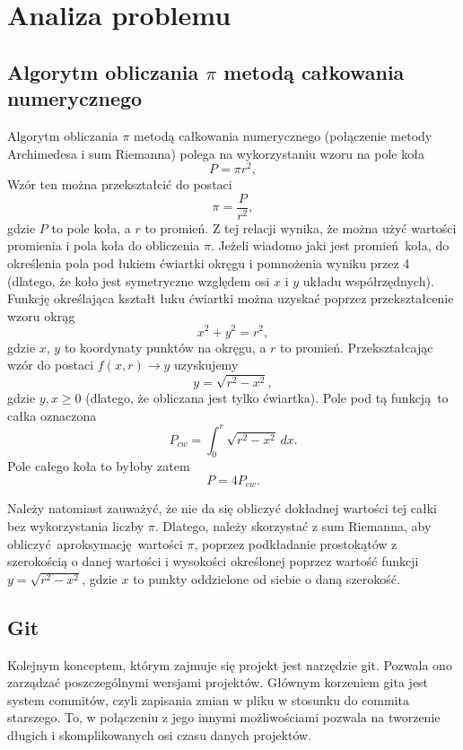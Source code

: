 \newpage
\section{Analiza problemu}		%

\subsection{Algorytm obliczania $\pi$ metodą całkowania numerycznego}

Algorytm obliczania $\pi$ metodą całkowania numerycznego (połączenie metody Archimedesa\cite{archimedes} i sum Riemanna\cite{riemannwiki}) polega na wykorzystaniu wzoru na pole koła \[P = \pi r^2,\] Wzór ten można przekształcić do postaci \[\pi = \frac{P}{r^2},\] gdzie $P$ to pole koła, a $r$ to promień. Z tej relacji wynika, że można użyć wartości promienia i pola koła do obliczenia $\pi$. Jeżeli wiadomo jaki jest promień koła, do określenia pola pod łukiem ćwiartki okręgu i pomnożenia wyniku przez 4 (dlatego, że koło jest symetryczne względem osi $x$ i $y$ układu współrzędnych). Funkcję określająca kształt łuku ćwiartki można uzyskać poprzez przekształcenie wzoru okrąg \[x^2 + y^2 = r^2,\] gdzie $x$, $y$ to koordynaty punktów na okręgu, a $r$ to promień. Przekształcając wzór do postaci $f(x,r) \to y$ uzyskujemy \[y = \sqrt{r^2 - x^2},\] gdzie $y, x \geq 0$ (dlatego, że obliczana jest tylko ćwiartka). Pole pod tą funkcją to całka oznaczona \[P_{cw} = \int_{0}^{r} \sqrt{r^2 - x^2} \,dx.\] Pole całego koła to byłoby zatem \[P = 4P_{cw}.\]

Należy natomiast zauważyć, że nie da się obliczyć dokładnej wartości tej całki bez wykorzystania liczby $\pi$. Dlatego, należy skorzystać z sum Riemanna\cite{riemannwiki}, aby obliczyć aproksymację wartości $\pi$, poprzez podkładanie prostokątów z szerokością o danej wartości i wysokości określonej poprzez wartość funkcji $y = \sqrt{r^2 - x^2}$, gdzie $x$ to punkty oddzielone od siebie o daną szerokość.

\subsection{Git}
Kolejnym konceptem, którym zajmuje się projekt jest narzędzie git\cite{gitsite}. Pozwala ono zarządzać poszczególnymi wersjami projektów. Głównym korzeniem gita jest system commitów, czyli zapisania zmian w pliku w stosunku do commita starszego. To, w połączeniu z jego innymi możliwościami pozwala na tworzenie długich i skomplikowanych osi czasu danych projektów. 

